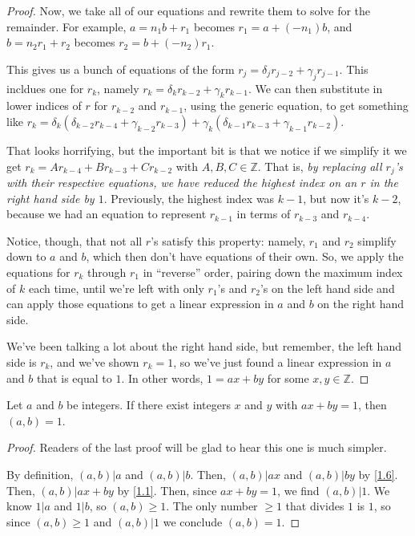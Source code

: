 \documentclass[../main.tex]{subfiles}
\begin{document}
\begin{proof}
  Now, we take all of our equations and rewrite them to solve for the remainder. For example, $a = n_1 b + r_1$ becomes $r_1 = a + (-n_1) b$, and $b = n_2 r_1 + r_2$ becomes $r_2 = b + (-n_2) r_1$.

  This gives us a bunch of equations of the form $r_j = \delta_{j} r_{j-2} + \gamma_{j} r_{j-1}$. This incldues one for $r_k$, namely $r_k = \delta_k r_{k-2} + \gamma_k r_{k-1}$.
  We can then substitute in lower indices of $r$ for $r_{k-2}$ and $r_{k-1}$, using the generic equation, to get something like $r_k = \delta_k (\delta_{k-2} r_{k-4} + \gamma_{k-2} r_{k-3}) + \gamma_k (\delta_{k-1} r_{k-3} + \gamma_{k-1} r_{k-2})$.

  That looks horrifying, but the important bit is that we notice if we simplify it we get $r_k = Ar_{k-4} + Br_{k-3} + Cr_{k-2}$ with $A, B, C \in \mathbb{Z}$. That is, \emph{by replacing all $r_j$'s with their respective equations, we have reduced the highest index on an $r$ in the right hand side by $1$}. Previously, the highest index was $k-1$, but now it's $k-2$, because we had an equation to represent $r_{k-1}$ in terms of $r_{k-3}$ and $r_{k-4}$.

  Notice, though, that not all $r$'s satisfy this property: namely, $r_1$ and $r_2$ simplify down to $a$ and $b$, which then don't have equations of their own. So, we apply the equations for $r_k$ through $r_1$ in ``reverse'' order, pairing down the maximum index of $k$ each time, until we're left with only $r_1$'s and $r_2$'s on the left hand side and can apply those equations to get a linear expression in $a$ and $b$ on the right hand side.

  We've been talking a lot about the right hand side, but remember, the left hand side is $r_k$, and we've shown $r_k = 1$, so we've just found a linear expression in $a$ and $b$ that is equal to $1$. In other words, $1 = ax + by$ for some $x, y \in \mathbb{Z}$.
\end{proof}



\begin{thm} \label{1.39}
  Let $a$ and $b$ be integers. If there exist integers $x$ and $y$ with $ax + by = 1$, then $(a, b) = 1$.
\end{thm}

\begin{proof}
  Readers of the last proof will be glad to hear this one is much simpler.

  By definition, $(a, b) | a$ and $(a, b) | b$. Then, $(a, b) | ax$ and $(a, b) | by$ by \ref{1.6}. Then, $(a, b) | ax + by$ by \ref{1.1}. Then, since $ax + by = 1$, we find $(a, b) | 1$. We know $1 | a$ and $1 | b$, so $(a, b) \geq 1$. The only number $\geq 1$ that divides $1$ is $1$, so since $(a, b) \geq 1$ and $(a, b) | 1$ we conclude $(a, b) = 1$.
\end{proof}
\end{document}
